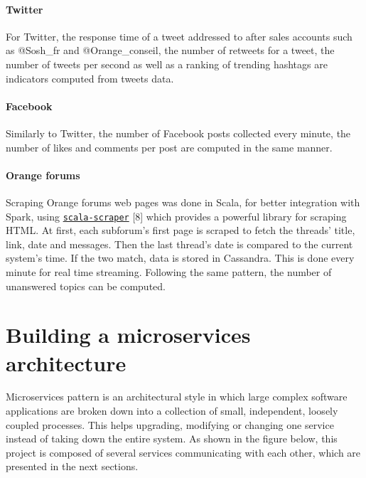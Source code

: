 \documentclass[11pt]{article}
\begin{document}
\paragraph{Twitter}

For \textsf{Twitter}, the response time of a tweet addressed to after sales accounts such as \textsf{@Sosh\_fr} and \textsf{@Orange\_conseil}, the number of retweets for a tweet, the number of tweets per second as well as a ranking of trending hashtags are indicators computed from tweets data.

\paragraph{Facebook}

Similarly to \textsf{Twitter}, the number of \textsf{Facebook} posts collected every minute, the number of likes and comments per post are computed in the same manner.

\paragraph{Orange forums}

Scraping \textsf{Orange} forums web pages was done in \textsf{Scala}, for better integration with \textsf{Spark}, using \href{https://github.com/ruippeixotog/scala-scraper}{\texttt{scala-scraper}} [8] which provides a powerful library for scraping \textsf{HTML}. At first, each subforum's first page is scraped to fetch the threads' title, link, date and messages. Then the last thread's date is compared to the current system's time. If the two match, data is stored in \textsf{Cassandra}. This is done every minute for real time streaming. Following the same pattern, the number of unanswered topics can be computed. 

\section{Building a microservices architecture}


Microservices pattern is an architectural style in which large complex software applications are broken down into a collection of small, independent, loosely coupled processes. This helps upgrading, modifying or changing one service instead of taking down the entire system. As shown in the figure below, this project is composed of several services communicating with each other, which are presented in the next sections.
\end{document}

